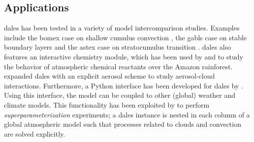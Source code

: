 \subsection{Applications}
\acrshort{dales} has been tested in a variety of model intercomparison studies. Examples include the \acrshort{bomex} case on shallow cumulus convection \citep{siebesmaLargeEddySimulation2003}, the \acrshort{gabls} case on stable boundary layers \citep{beareIntercomparisonLargeEddySimulations2006} and the \acrshort{astex} case on stratocumulus transition \citep{vanderdussenGASSEUCLIPSEModel2013}. \acrshort{dales} also features an interactive chemistry module, which has been used by \citet{vila-gueraudearellanoRoleBoundaryLayer2011} and \citet{ouwerslootQuantifyingTransportSubcloud2013} to study the behavior of atmospheric chemical reactants over the Amazon rainforest. \citet{debruineExplicitAerosolCloud2019} expanded \acrshort{dales} with an explicit aerosol scheme to study aerosol-cloud interactions. Furthermore, a Python interface has been developed for \acrshort{dales} by \citet{vandenoordPythonInterfaceDutch2020}. Using this interface, the model can be coupled to other (global) weather and climate models. This functionality has been exploited by \citet{janssonRegionalSuperparameterizationGlobal2019} to perform \emph{superparameterization} experiments; a \acrshort{dales} instance is nested in each column of a global atmospheric model such that processes related to clouds and convection are solved explicitly.